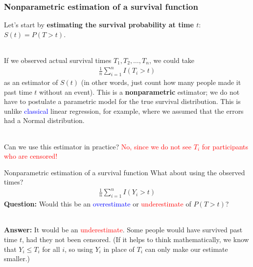 \documentclass[10pt,t]{beamer}
\begin{document}
\begin{frame}
\frametitle{Nonparametric estimation of a survival function}
Let's start by \textbf{estimating the survival probability at time $t$}: $S(t) = P(T > t)$.
\\ ~\ 

If we observed actual survival times $T_1, T_2, \dots, T_n$, we could take
\begin{align*}
\frac{1}{n}\sum_{i=1}^n I(T_i > t)
\end{align*}
as an estimator of $S(t)$ (in other words, just count how many people made it past time $t$ without an event). This is a \textbf{nonparametric} estimator; we do not have to postulate a parametric model for the true survival distribution. This is unlike \textcolor{blue}{classical} linear regression, for example, where we assumed that the errors had a Normal distribution. 
\\ ~\ 

Can we use this estimator in practice?   \textcolor{red}{No, since we do not see $T_i$ for participants who are censored!}
\end{frame}

\begin{frame}{Nonparametric estimation of a survival function}
	What about using the observed times?
	\begin{align*}
		\frac{1}{n}\sum_{i=1}^{n}I(Y_i > t)
	\end{align*}
	\textbf{Question:} Would this be an \textcolor{blue}{overestimate} or \textcolor{red}{underestimate} of $P(T > t)$?   
	\\ ~\ 
	
	\textbf{Answer:} It would be an \textcolor{red}{underestimate}. Some people would have survived past time $t$, had they not been censored. (If it helps to think mathematically, we know that $Y_i \leq T_i$ for all $i$, so using $Y_i$ in place of $T_i$ can only make our estimate smaller.)
\end{frame}
\end{document}
